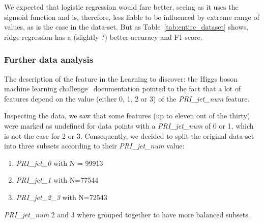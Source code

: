 \documentclass[10pt,conference,compsocconf]{IEEEtran}
\begin{document}
\begin{table}[ht]
\centering
{}
\caption{Parameters and training results after preprocessing the data.}
\label{tab:entire_dataset}
\end{table}

We expected that logistic regression would fare better, seeing as it uses 
the sigmoid function and is, therefore, less liable to be influenced by extreme 
range of values, as is the case in the data-set. 
But as Table~\ref{tab:entire_dataset} shows, ridge regression has a (slightly ?) better 
accuracy and F1-score.

\subsubsection{Further data analysis}
The description of the feature in the Learning to discover: the Higgs
boson machine learning challenge~\cite{higgsMLdoc} documentation pointed 
to the fact that a lot of features depend on the value (either 0, 1, 2 or 3)
of the \textit{PRI\_jet\_num} feature.

Inspecting the data, we saw that some features (up to eleven out of the thirty) 
were marked as undefined for data points with a \textit{PRI\_jet\_num} of 0 or 1, 
which is not the case for 2 or 3. Consequently, we decided to split the 
original data-set into three subsets according to their \textit{PRI\_jet\_num} value: 
\begin{enumerate}
    \item \textit{PRI\_jet\_0} with N = 99913
    \item \textit{PRI\_jet\_1} with N=77544
    \item \textit{PRI\_jet\_2\_3} with N=72543
\end{enumerate}
\textit{PRI\_jet\_num} 2 and 3 where grouped together to have more 
balanced subsets.
\end{document}
